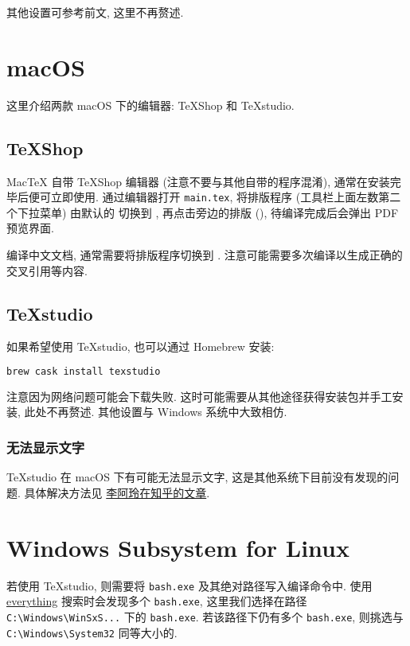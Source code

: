 其他设置可参考前文, 这里不再赘述.

\section{macOS}

这里介绍两款 macOS 下的编辑器:
\TeX Shop 和 \TeX studio.

\subsection{\TeX Shop}

Mac\TeX{} 自带 \TeX Shop 编辑器 (注意不要与其他自带的程序混淆),
通常在安装完毕后便可立即使用.
通过编辑器打开 \texttt{main.tex},
将排版程序 (工具栏上面左数第二个下拉菜单) 由默认的  切换到
,
再点击旁边的排版  (),
待编译完成后会弹出 PDF 预览界面.

编译中文文档, 通常需要将排版程序切换到 .
注意可能需要多次编译以生成正确的交叉引用等内容.

\subsection{\TeX studio}

如果希望使用 \TeX studio, 也可以通过 Homebrew 安装:
\begin{lstlisting}[language=bash]
  brew cask install texstudio
\end{lstlisting}
注意因为网络问题可能会下载失败.
这时可能需要从其他途径获得安装包并手工安装, 此处不再赘述.
其他设置与 Windows 系统中大致相仿.

\subsubsection{无法显示文字}

\TeX studio 在 macOS 下有可能无法显示文字,
这是其他系统下目前没有发现的问题.
具体解决方法见%
\href{https://zhuanlan.zhihu.com/p/80728204}{李阿玲在知乎的文章}.

\section{Windows Subsystem for Linux}

若使用 \TeX studio,
则需要将 \texttt{bash.exe} 及其绝对路径写入编译命令中.
使用
\href{https://www.voidtools.com/zh-cn/}{everything}
搜索时会发现多个 \texttt{bash.exe},
这里我们选择在路径
\texttt{C:\textbackslash Windows\textbackslash WinSxS...}
下的 \texttt{bash.exe}.
若该路径下仍有多个 \texttt{bash.exe},
则挑选与
\texttt{C:\textbackslash Windows\textbackslash System32}
同等大小的.

